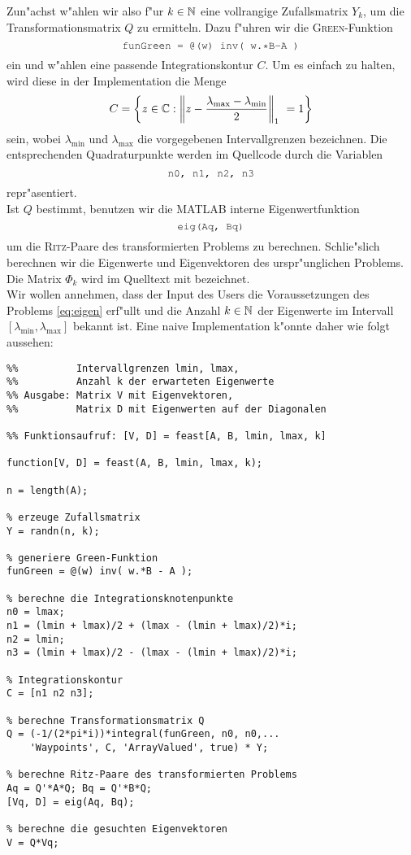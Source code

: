 Zun"achst w"ahlen wir also f"ur $k\in\mathbb{N}$ eine vollrangige Zufallsmatrix $Y_k$, um
die Transformationsmatrix $Q$ zu ermitteln. Dazu f"uhren wir die \textsc{Green}-Funktion
\[
\mcode{funGreen = @(w) inv( w.*B-A )}
\]
ein und w"ahlen eine passende Integrationskontur
$C$. Um es einfach zu halten, wird diese in der Implementation die Menge
\[
C = \left\{ z \in \mathbb{C} : \left\lVert z - \frac{\lambda_\text{max} -
\lambda_\text{min}}{2} \right\rVert_1\ = 1\right\}
\]
sein, wobei $\lambda_\text{min}$ und $\lambda_\text{max}$ die vorgegebenen Intervallgrenzen
bezeichnen. Die entsprechenden Quadraturpunkte werden im Quellcode durch die
Variablen
\[
\mcode{n0, n1, n2, n3}
\]
repr"asentiert.\\

Ist $Q$ bestimmt, benutzen wir die MATLAB interne Eigenwertfunktion
\[
\mcode{eig(Aq, Bq)}
\]
um die \textsc{Ritz}-Paare des transformierten Problems zu berechnen. Schlie"slich
berechnen wir die Eigenwerte und Eigenvektoren des urspr"unglichen Problems.
Die Matrix $\Phi_k$ wird im Quelltext mit   bezeichnet.\\

Wir wollen annehmen, dass der Input des Users die Voraussetzungen des
Problems \eqref{eq:eigen} erf"ullt und die Anzahl $k\in\mathbb{N}$ der Eigenwerte
im Intervall $[\lambda_\text{min}, \lambda_\text{max}]$ bekannt ist.
Eine naive Implementation k"onnte daher wie folgt aussehen:

\begin{lstlisting}[caption=Naive FEAST Implementation., captionpos=b]
%% Eingabe: Matrizen A, B des Eigenwertproblems,
%%          Intervallgrenzen lmin, lmax,
%%	        Anzahl k der erwarteten Eigenwerte
%% Ausgabe: Matrix V mit Eigenvektoren,
%%          Matrix D mit Eigenwerten auf der Diagonalen

%% Funktionsaufruf: [V, D] = feast[A, B, lmin, lmax, k]

function[V, D] = feast(A, B, lmin, lmax, k);

n = length(A);

% erzeuge Zufallsmatrix
Y = randn(n, k);

% generiere Green-Funktion
funGreen = @(w) inv( w.*B - A );

% berechne die Integrationsknotenpunkte
n0 = lmax;
n1 = (lmin + lmax)/2 + (lmax - (lmin + lmax)/2)*i;
n2 = lmin;
n3 = (lmin + lmax)/2 - (lmax - (lmin + lmax)/2)*i;

% Integrationskontur
C = [n1 n2 n3];

% berechne Transformationsmatrix Q
Q = (-1/(2*pi*i))*integral(funGreen, n0, n0,...
	'Waypoints', C, 'ArrayValued', true) * Y;

% berechne Ritz-Paare des transformierten Problems
Aq = Q'*A*Q; Bq = Q'*B*Q;
[Vq, D] = eig(Aq, Bq);

% berechne die gesuchten Eigenvektoren
V = Q*Vq;
\end{lstlisting}

